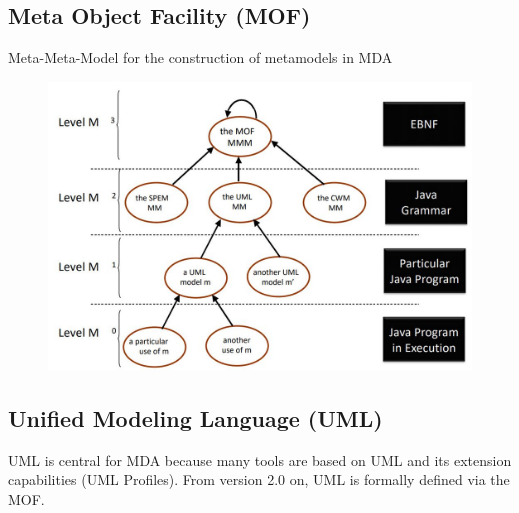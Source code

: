 		\subsection{Meta Object Facility (MOF)}
			Meta-Meta-Model for the construction of	metamodels in MDA
			\begin{figure}[h!]
				\includegraphics[scale=0.45]{res/mof-hierarchy.jpg}
			\end{figure}
		
		\pagebreak
		
		\subsection{Unified Modeling Language (UML)}
			UML is central for MDA because many tools are based on UML and its extension capabilities (UML Profiles). From version 2.0 on, UML is formally defined via the	MOF.
			
